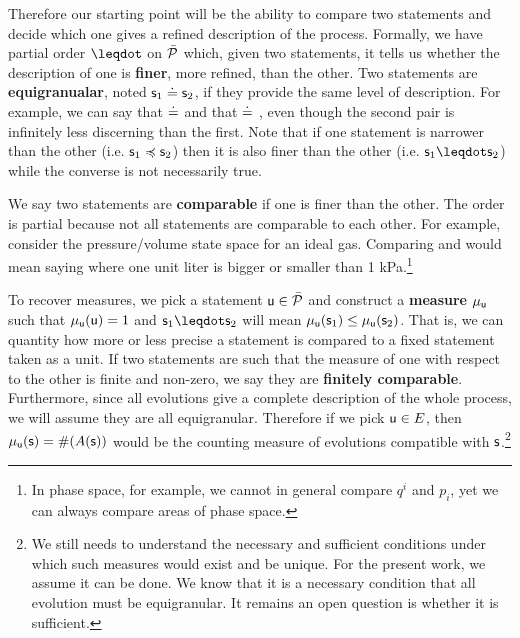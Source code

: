 \documentclass[letterpaper]{article}
\begin{document}
Therefore our starting point will be the ability to compare two statements and decide which one gives a refined description of the process. Formally, we have partial order $\finer$ on $\tdomain[P]$ which, given two statements, it tells us whether the description of one is \textbf{finer}, more refined, than the other. Two statements are \textbf{equigranualar}, noted $\stmt_1 \eqgran \stmt_2$, if they provide the same level of description. For example, we can say that  $\eqgran$  and that  $\eqgran$ , even though the second pair is infinitely less discerning than the first. Note that if one statement is narrower than the other (i.e. $\stmt_1 \narrower \stmt_2$) then it is also finer than the other (i.e. $\stmt_1 \finer \stmt_2$) while the converse is not necessarily true. 


We say two statements are \textbf{comparable} if one is finer than the other. The order is partial because not all statements are comparable to each other. For example, consider the pressure/volume state space for an ideal gas. Comparing  and  would mean saying where one unit liter is bigger or smaller than 1 kPa.\footnote{In phase space, for example, we cannot in general compare $q^i$ and $p_i$, yet we can always compare areas of phase space.}

To recover measures, we pick a statement $\stmt[u] \in \tdomain[P]$ and construct a \textbf{measure} $\mu_{\stmt[u]}$ such that $\mu_{\stmt[u]}(\stmt[u]) = 1$ and $\stmt_1 \finer \stmt_2$ will mean $\mu_{\stmt[u]}(\stmt_1) \leq \mu_{\stmt[u]}(\stmt_2)$. That is, we can quantity how more or less precise a statement is compared to a fixed statement taken as a unit. If two statements are such that the measure of one with respect to the other is finite and non-zero, we say they are \textbf{finitely comparable}. Furthermore, since all evolutions give a complete description of the whole process, we will assume they are all equigranular. Therefore if we pick $\stmt[u] \in E$, then $\mu_{\stmt[u]}(\stmt)=\#(A(\stmt))$ would be the counting measure of evolutions compatible with $\stmt$.\footnote{We still needs to understand the necessary and sufficient conditions under which such measures would exist and be unique. For the present work, we assume it can be done. We know that it is a necessary condition that all evolution must be equigranular. It remains an open question is whether it is sufficient.}
\end{document}
